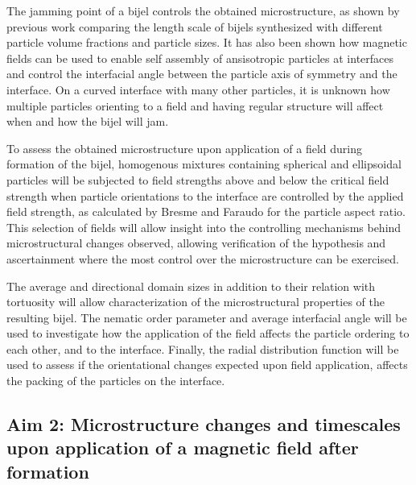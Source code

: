 The jamming point of a bijel controls the obtained microstructure, as shown by previous work comparing the length scale of bijels synthesized 
with different particle volume fractions and particle sizes. \cite{jansen_bijels_2011, reeves_particle-size_2015} It has also been shown how magnetic fields 
can be used to enable self assembly of ansisotropic particles at interfaces and control the interfacial angle between the particle axis of symmetry and the interface. 
\cite{davies_interface_2014, davies_assembling_2014}
On a curved interface with many other particles, it is unknown how multiple particles orienting to a field and having regular structure will affect when and how the bijel 
will jam. \cite{bresme_orientational_2007, davies_interface_2014}

To assess the obtained microstructure upon application of a field during formation of the bijel, homogenous mixtures containing spherical and 
ellipsoidal particles will be subjected to field strengths above and below the critical field strength when particle orientations to the 
interface are controlled by the applied field strength, as calculated by Bresme and Faraudo for the particle aspect ratio. \cite{bresme_orientational_2007, davies_interface_201} This selection of fields 
will allow insight into the controlling mechanisms behind microstructural changes observed, allowing verification of the hypothesis and 
ascertainment where the most control over the microstructure can be exercised.

The average and directional domain sizes in addition to their relation with tortuosity will allow characterization of the microstructural properties 
of the resulting bijel. The nematic order parameter and average interfacial angle will be used to investigate how the application of the 
field affects the particle ordering to each other, and to the interface. Finally, the radial distribution function will be used to assess 
if the orientational changes expected upon field application, affects the packing of the particles on the interface.

\subsection{Aim 2: Microstructure changes and timescales upon application of a magnetic field after formation}
\label{section:aim2_desc}

